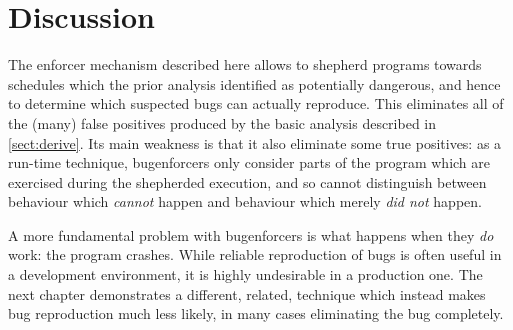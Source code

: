 \section{Discussion}

The enforcer mechanism described here allows {\technique} to shepherd
programs towards schedules which the prior analysis identified as
potentially dangerous, and hence to determine which suspected bugs can
actually reproduce.  This eliminates all of the (many) false positives
produced by the basic analysis described in \autoref{sect:derive}.
Its main weakness is that it also eliminate some true positives: as a
run-time technique, \glspl{bugenforcer} only consider parts of the
program which are exercised during the shepherded execution, and so
cannot distinguish between behaviour which \emph{cannot} happen and
behaviour which merely \emph{did not} happen.

A more fundamental problem with \glspl{bugenforcer} is what happens
when they \emph{do} work: the program crashes.  While reliable
reproduction of bugs is often useful in a development environment, it
is highly undesirable in a production one.  The next chapter
demonstrates a different, related, technique which instead makes bug
reproduction much less likely, in many cases eliminating the bug
completely.

